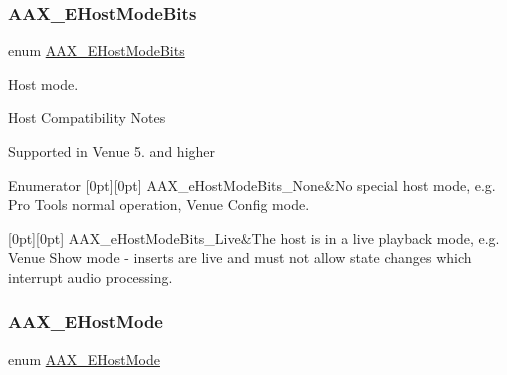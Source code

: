 \subsubsection{\texorpdfstring{AAX\_EHostModeBits}{AAX\_EHostModeBits}}
{\footnotesize\ttfamily enum \mbox{\hyperlink{a00491_aa3c8056a6ce601cc3367cb7d4478e9da}{A\+A\+X\+\_\+\+E\+Host\+Mode\+Bits}}}



Host mode. 

\begin{DoxyRefDesc}{Host Compatibility Notes}
\item[\mbox{\hyperlink{a00786__compatibility_notes000027}{Host Compatibility Notes}}]Supported in Venue 5. and higher \end{DoxyRefDesc}
\begin{DoxyEnumFields}{Enumerator}
[0pt][0pt]{}\mbox{\label{a00491_aa3c8056a6ce601cc3367cb7d4478e9daaa72ba643264dbc37d627b91534db7c1a}} 
A\+A\+X\+\_\+e\+Host\+Mode\+Bits\+\_\+\+None&No special host mode, e.\+g. Pro Tools normal operation, Venue Config mode. \\
\hline

[0pt][0pt]{}\mbox{\label{a00491_aa3c8056a6ce601cc3367cb7d4478e9daa83555a8ed532fa43f3583af95ca3d39b}} 
A\+A\+X\+\_\+e\+Host\+Mode\+Bits\+\_\+\+Live&The host is in a live playback mode, e.\+g. Venue Show mode -\/ inserts are live and must not allow state changes which interrupt audio processing. \\
\hline

\end{DoxyEnumFields}
\mbox{\label{a00491_af7d77416967955e258539694870f395a}} 
\subsubsection{\texorpdfstring{AAX\_EHostMode}{AAX\_EHostMode}}
{\footnotesize\ttfamily enum \mbox{\hyperlink{a00491_af7d77416967955e258539694870f395a}{A\+A\+X\+\_\+\+E\+Host\+Mode}}}



